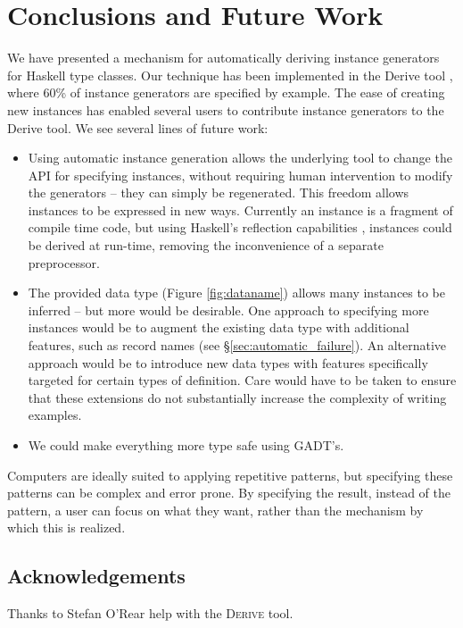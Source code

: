 \documentclass[preprint]{sigplanconf}
\newcommand{\derive}{\textsc{Derive}}
\begin{document}
\section{Conclusions and Future Work}
\label{sec:conclusion}

We have presented a mechanism for automatically deriving instance generators for Haskell type classes. Our technique has been implemented in the Derive tool \cite{derive}, where 60\% of instance generators are specified by example. The ease of creating new instances has enabled several users to contribute instance generators to the Derive tool. We see several lines of future work:

\begin{itemize}
\item Using automatic instance generation allows the underlying tool to change the API for specifying instances, without requiring human intervention to modify the generators -- they can simply be regenerated. This freedom allows instances to be expressed in new ways. Currently an instance is a fragment of compile time code, but using Haskell's reflection capabilities \cite{lammel:syb2}, instances could be derived at run-time, removing the inconvenience of a separate preprocessor.
\item The provided data type (Figure \ref{fig:dataname}) allows many instances to be inferred -- but more would be desirable. One approach to specifying more instances would be to augment the existing data type with additional features, such as record names (see \S\ref{sec:automatic_failure}). An alternative approach would be to introduce new data types with features specifically targeted for certain types of definition. Care would have to be taken to ensure that these extensions do not substantially increase the complexity of writing examples.
\item We could make everything more type safe using GADT's.
\end{itemize}

Computers are ideally suited to applying repetitive patterns, but specifying these patterns can be complex and error prone. By specifying the result, instead of the pattern, a user can focus on what they want, rather than the mechanism by which this is realized.


\subsection*{Acknowledgements}

Thanks to Stefan O'Rear help with the \derive{} tool.


\balance



\end{document}
